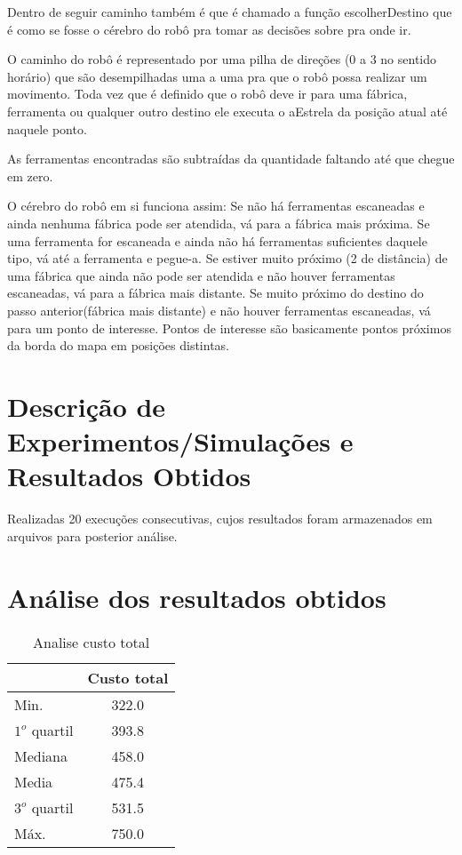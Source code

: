 \documentclass[12pt]{article}
\begin{document}
	 Dentro de seguir caminho também é que é chamado a função escolherDestino que é como se fosse o cérebro do robô pra tomar as decisões sobre pra onde ir. 
	 
	 O caminho do robô é representado por uma pilha de direções (0 a 3 no sentido horário) que são desempilhadas uma a uma pra que o robô possa realizar um movimento. 
	 Toda vez que é definido que o robô deve ir para uma fábrica, ferramenta ou qualquer outro destino ele executa o aEstrela da posição atual até naquele ponto. 
	 
	 As ferramentas encontradas são subtraídas da quantidade faltando até que chegue em zero. 
	 
	 O cérebro do robô em si funciona assim: 
	 	Se não há ferramentas escaneadas e ainda nenhuma fábrica pode ser atendida, vá para a fábrica mais próxima. 		
	 	Se uma ferramenta for escaneada e ainda não há ferramentas suficientes daquele tipo, vá até a ferramenta e pegue-a. 
	 	Se estiver muito próximo (2 de distância) de uma fábrica que ainda não pode ser atendida e não houver ferramentas escaneadas, vá para a fábrica mais distante. 
	 	Se muito próximo do destino do passo anterior(fábrica mais distante) e não houver ferramentas escaneadas, vá para um ponto de interesse.
	 	Pontos de interesse são basicamente pontos próximos da borda do mapa em posições distintas.
\section{Descrição de Experimentos/Simulações e Resultados Obtidos} \label{sec:DescExp}
Realizadas 20 execuções consecutivas, cujos resultados foram armazenados em arquivos para posterior análise.

\section{Análise dos resultados obtidos} \label{sec:Results}
\begin{table}[h]
	\centering
	\begin{tabular}{|l|c|}
	\hline
	& Custo total \\ \hline
	Min. & 322.0 \\ \hline
	$1^{o}$ quartil & 393.8 \\ \hline
	Mediana & 458.0 \\ \hline
	Media & 475.4 \\ \hline
	$3^{o}$ quartil & 531.5 \\ \hline
	Máx. & 750.0 \\ \hline
	\end{tabular}
	\caption{Analise custo total}
	\label{tabela:custo}
\end{table}
\end{document}
